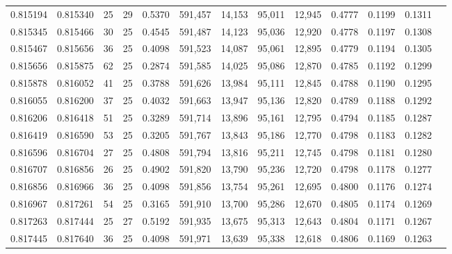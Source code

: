 \begin{tabular}{rrrrrrrrrrrrr}
0.815194 & 0.815340 &    25 &  29 &                                     0.5370 & 591,457 &  14,153 &  95,011 &  12,945 & 0.4777 & 0.1199 & 0.1311 \\
0.815345 & 0.815466 &    30 &  25 &                                     0.4545 & 591,487 &  14,123 &  95,036 &  12,920 & 0.4778 & 0.1197 & 0.1308 \\
0.815467 & 0.815656 &    36 &  25 &                                     0.4098 & 591,523 &  14,087 &  95,061 &  12,895 & 0.4779 & 0.1194 & 0.1305 \\
0.815656 & 0.815875 &    62 &  25 &                                     0.2874 & 591,585 &  14,025 &  95,086 &  12,870 & 0.4785 & 0.1192 & 0.1299 \\
0.815878 & 0.816052 &    41 &  25 &                                     0.3788 & 591,626 &  13,984 &  95,111 &  12,845 & 0.4788 & 0.1190 & 0.1295 \\
0.816055 & 0.816200 &    37 &  25 &                                     0.4032 & 591,663 &  13,947 &  95,136 &  12,820 & 0.4789 & 0.1188 & 0.1292 \\
0.816206 & 0.816418 &    51 &  25 &                                     0.3289 & 591,714 &  13,896 &  95,161 &  12,795 & 0.4794 & 0.1185 & 0.1287 \\
0.816419 & 0.816590 &    53 &  25 &                                     0.3205 & 591,767 &  13,843 &  95,186 &  12,770 & 0.4798 & 0.1183 & 0.1282 \\
0.816596 & 0.816704 &    27 &  25 &                                     0.4808 & 591,794 &  13,816 &  95,211 &  12,745 & 0.4798 & 0.1181 & 0.1280 \\
0.816707 & 0.816856 &    26 &  25 &                                     0.4902 & 591,820 &  13,790 &  95,236 &  12,720 & 0.4798 & 0.1178 & 0.1277 \\
0.816856 & 0.816966 &    36 &  25 &                                     0.4098 & 591,856 &  13,754 &  95,261 &  12,695 & 0.4800 & 0.1176 & 0.1274 \\
0.816967 & 0.817261 &    54 &  25 &                                     0.3165 & 591,910 &  13,700 &  95,286 &  12,670 & 0.4805 & 0.1174 & 0.1269 \\
0.817263 & 0.817444 &    25 &  27 &                                     0.5192 & 591,935 &  13,675 &  95,313 &  12,643 & 0.4804 & 0.1171 & 0.1267 \\
0.817445 & 0.817640 &    36 &  25 &                                     0.4098 & 591,971 &  13,639 &  95,338 &  12,618 & 0.4806 & 0.1169 & 0.1263 \\

\end{tabular}
